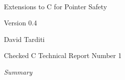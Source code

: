 \documentclass[11pt]{report}
\begin{document}
\begin{titlepage}
{\center
\mbox{ }\\
\vspace{2in}
{\huge Extensions to C for Pointer Safety \par}
{Version 0.4 \par}
\vspace{0.5in}
{David Tarditi \par} 
{Checked C Technical Report Number 1 \par}
\vspace{1in}
{\it Summary \par}

}
\end{titlepage}

\tableofcontents












%




\nocite{Jones2009}



\appendix
% 
% 
\end{document}
